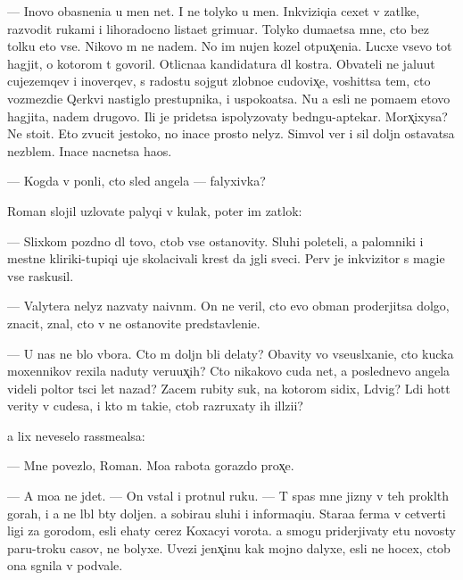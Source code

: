 \documentclass[10pt]{book}
\begin{document}
— Inovo ob{\y}asneni{\y}a u men{\ia} net. I ne tolyko u men{\ia}. Inkviziqi{\y}a cexet v zat{\yi}lke, razvodit rukami i lihoradocno lista{\y}et grimuar{\yi}. Tolyko duma{\y}etsa mne, cto bez tolku eto vse. Nikovo m{\yi} ne na{\y}dem. No im nujen kozel otpux̨eni{\y}a. Lucxe vsevo tot hagjit, o kotorom t{\yi} govoril. Otlicna{\y}a kandidatura dl{\ia} kostra. Ob{\yi}vateli ne jalu{\y}ut cujezemqev i inoverqev, s radost{\y}u sojgut zlobno{\y}e cudovix̨e, voshit{\ia}tsa tem, cto vozmezdi{\y}e Qerkvi nastiglo prestupnika, i uspoko{\y}atsa. Nu a {\y}esli ne po{\y}ma{\y}em etovo hagjita, na{\y}dem drugovo. Ili je pridetsa ispolyzovaty bedn{\ia}gu-aptekar{\ia}. Morx̨ixysa? Ne sto{\y}it. Eto zvucit jestoko, no inace prosto nelyz{\ia}. Simvol{\yi} ver{\yi} i sil{\yi} doljn{\yi} ostavatsa nez{\yi}blem{\yi}. Inace nacnetsa haos.

— Kogda v{\yi} pon{\ia}li, cto sled angela — falyxivka?

Roman slojil uzlovat{\yi}{\y}e palyqi v kulak, poter im zat{\yi}lok:

— Slixkom pozdno dl{\ia} tovo, ctob{\yi} vse ostanovity. Sluhi poleteli, a palomniki i mestn{\yi}{\y}e kliriki-tupiqi uje skolacivali krest da jgli sveci. Perv{\yi}{\y} je inkvizitor s magi{\y}e{\y} vse raskusil.

— Valytera nelyz{\ia} nazvaty na{\y}ivn{\yi}m. On ne veril, cto {\y}evo obman proderjitsa dolgo, znacit, znal, cto v{\yi} ne ostanovite predstavleni{\y}e.

— U nas ne b{\yi}lo v{\yi}bora. Cto m{\yi} doljn{\yi} b{\yi}li delaty? Ob{\y}avity vo vseusl{\yi}xani{\y}e, cto kucka moxennikov rexila naduty veru{\y}ux̨ih? Cto nikakovo cuda net, a poslednevo angela videli poltor{\yi} t{\yi}s{\ia}ci let nazad? Zacem rubity suk, na kotorom sidix, L{\iu}dvig? L{\iu}di hot{\ia}t verity v cudesa, i kto m{\yi} taki{\y}e, ctob{\yi} razruxaty ih ill{\iu}zi{\y}i?

{\Y}a lix neveselo rassme{\y}alsa:

— Mne povezlo, Roman. Mo{\y}a rabota gorazdo prox̨e.

— A mo{\y}a ne jdet. — On vstal i prot{\ia}nul ruku. — T{\yi} spas mne jizny v teh prokl{\ia}t{\yi}h gorah, i {\y}a ne l{\iu}bl{\iu} b{\yi}ty doljen. {\Y}a sobira{\y}u sluhi i informaqi{\y}u. Stara{\y}a ferma v cetverti ligi za gorodom, {\y}esli {\y}ehaty cerez Koxacyi vorota. {\Y}a smogu priderjivaty etu novosty paru-tro{\y}ku casov, ne bolyxe. Uvezi jenx̨inu kak mojno dalyxe, {\y}esli ne hocex, ctob{\yi} ona sgnila v podvale.
\end{document}
